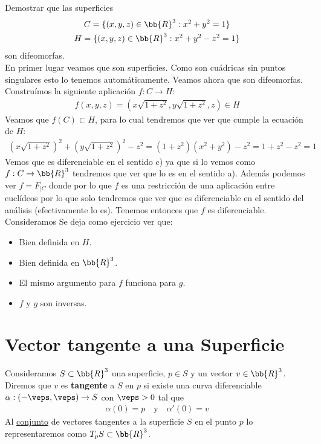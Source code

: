 \begin{ejercicio}
    Demostrar que las superficies 
    \begin{gather*}
        C = \{(x,y,z)\in \bb{R}^3 : x^2 + y^2 = 1\}\\
        H = \{(x,y,z)\in \bb{R}^3 : x^2 + y^2 -z^2 = 1\}
    \end{gather*}
    son difeomorfas.\\

    En primer lugar veamos que son superficies. Como son cuádricas sin puntos singulares esto lo tenemos automáticamente. Veamos ahora que son difeomorfas. Construímos la siguiente aplicación $f : C \to H$:
    \begin{gather*}
        f(x,y,z) = (x\sqrt{1+z^2}, y\sqrt{1+z^2}, z)\in H
    \end{gather*}
    Veamos que $f(C)\subset H$, para lo cual tendremos que ver que cumple la ecuación de $H$:
    \begin{gather*}
        (x\sqrt{1+z^2})^2 + (y\sqrt{1+z^2})^2 - z^2 = (1+z^2)(x^2 + y^2) - z^2 = 1+z^2 -z^2 = 1
    \end{gather*}
    Vemos que es diferenciable en el sentido c) ya que si lo vemos como $f:C\to \bb{R}^3$ tendremos que ver que lo es en el sentido a). Además podemos ver $f = F_{|C}$ donde 
    por lo que $f$ es una restricción de una aplicación entre euclídeos por lo que solo tendremos que ver que es diferenciable en el sentido del análisis (efectivamente lo es). Tenemos entonces que $f$ es diferenciable. Consideramos 
    Se deja como ejercicio ver que:
    \begin{itemize}
        \item Bien definida en $H$.
        \item Bien definida en $\bb{R}^3$.
        \item El mismo argumento para $f$ funciona para $g$.
        \item $f$ y $g$ son inversas.
    \end{itemize}
\end{ejercicio}

\section{Vector tangente a una Superficie}

\begin{definicion}
    Consideramos $S\subset \bb{R}^3$ una superficie, $p\in S$ y un vector $v\in \bb{R}^3$. Diremos que $v$ es \textbf{tangente} a $S$ en $p$ si existe una curva diferenciable $\alpha : (-\veps, \veps) \to S$ con $\veps > 0$ tal que
    \begin{gather*}
        \alpha(0)=p\ \ \ \text{ y } \ \ \ \alpha'(0)=v
    \end{gather*}
    Al \underline{conjunto} de vectores tangentes a la superficie $S$ en el punto $p$ lo representaremos como $T_pS \subset \bb{R}^3$.
\end{definicion}

